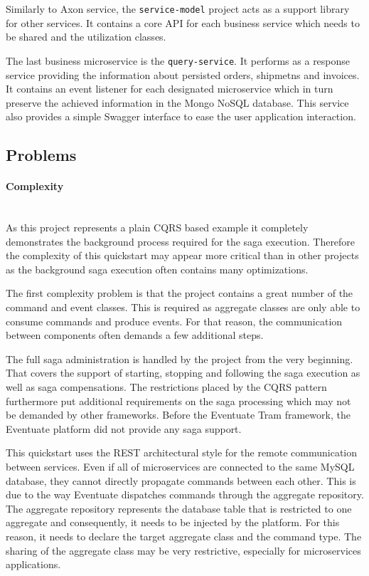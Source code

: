 \documentclass[oneside,
  digital, %
  table,   %
  nolof,     %
  nolot,     %
]{fithesis3}
\newcommand{\newlinepar}[1]{\paragraph{#1}\needspace{4\baselineskip}\mbox{}\\}
\begin{document}
Similarly to Axon service, the \texttt{service-model} project acts as a support library for other services. It contains a core API for each business service which needs to be shared and the utilization classes.

The last business microservice is the \texttt{query-service}. It performs as a response service providing the information about persisted orders, shipmetns and invoices. It contains an event listener for each designated microservice which in turn preserve the achieved information in the Mongo NoSQL database. This service also provides a simple Swagger interface to ease the user application interaction.

\subsection{Problems}

\newlinepar{Complexity}

As this project represents a plain CQRS based example it completely demonstrates the background process required for the saga execution. Therefore the complexity of this quickstart may appear more critical than in other projects as the background saga execution often contains many optimizations.

The first complexity problem is that the project contains a great number of the command and event classes. This is required as aggregate classes are only able to consume commands and produce events. For that reason,  the communication between components often demands a few additional steps.

The full saga administration is handled by the project from the very beginning. That covers the support of starting, stopping and following the saga execution as well as saga compensations. The restrictions placed by the CQRS pattern furthermore put additional requirements on the saga processing which may not be demanded by other frameworks. Before the Eventuate Tram framework, the Eventuate platform did not provide any saga support.

This quickstart uses the REST architectural style for the remote communication between services. Even if all of microservices are connected to the same MySQL database, they cannot directly propagate commands between each other. This is due to the way Eventuate dispatches commands through the aggregate repository. The aggregate repository represents the database table that is restricted to one aggregate and consequently, it needs to be injected by the platform. For this reason, it needs to declare the target aggregate class and the command type. The sharing of the aggregate class may be very restrictive, especially for microservices applications.
\end{document}
